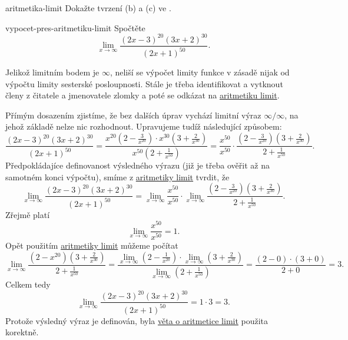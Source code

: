 \begin{exercise}{}{aritmetika-limit}
 Dokažte tvrzení (b) a (c) ve .
\end{exercise}

\begin{problem}{}{vypocet-pres-aritmetiku-limit}
 Spočtěte
 \[
  \lim_{x \to \infty} \frac{(2x - 3)^{20} (3x + 2)^{30}}{(2x + 1)^{50}}.
 \]
\end{problem}
\begin{probsol}
 Jelikož limitním bodem je $\infty$, neliší se výpočet limity funkce v zásadě
 nijak od výpočtu limity sesterské posloupnosti. Stále je třeba identifikovat a
 vytknout  členy z čitatele a jmenovatele zlomky a poté
 se odkázat na \hyperref[thm:aritmetika-limit-funkci]{aritmetiku limit}.

 Přímým dosazením zjistíme, že bez dalších úprav vychází limitní výraz $\infty /
 \infty$, na jehož základě nelze nic rozhodnout. Upravujeme tudíž následující
 způsobem:
 \[
  \frac{(2x-3)^{20}(3x+2)^{30}}{(2x+1)^{50}} = \frac{x^{20}(2 -
  \frac{3}{x^{20}}) \cdot x^{30}(3 + \frac{2}{x^{30}})}{x^{50}(2 +
 	\frac{1}{x^{50}})} = \frac{x^{50}}{x^{50}} \cdot \frac{(2 - \frac{3}{x^{20}})(3
 	+ \frac{2}{x^{30}})}{2 + \frac{1}{x^{50}}}.
 \]
 Předpokládajíce definovanost výsledného výrazu (již je třeba ověřit až na
 samotném konci výpočtu), smíme z
 \hyperref[thm:aritmetika-limit-funkci]{aritmetiky limit} tvrdit, že
 \[
  \lim_{x \to \infty} \frac{(2x-3)^{20}(3x+2)^{30}}{(2x+1)^{50}} = \lim_{x \to
  \infty} \frac{x^{50}}{x^{50}} \cdot \lim_{x \to \infty} \frac{(2 -
  \frac{3}{x^{20}})(3 + \frac{2}{x^{30}})}{2 + \frac{1}{x^{50}}}.
 \]
 Zřejmě platí
 \[
  \lim_{x \to \infty} \frac{x^{50}}{x^{50}} = 1.
 \]
 Opět použitím \hyperref[thm:aritmetika-limit-funkci]{aritmetiky limit} můžeme
 počítat
 \[
  \lim_{x \to \infty} \frac{(2 - x^{20})(3 + \frac{2}{x^{30}})}{2 +
  \frac{1}{x^{50}}} = \frac{\lim_{x \to \infty} (2 - \frac{1}{x^{20}}) \cdot
 	\lim_{x \to \infty} (3 + \frac{2}{x^{30}})}{\lim_{x \to \infty} (2 +
 	\frac{1}{x^{50}})} = \frac{(2 - 0) \cdot (3 + 0)}{2 + 0} = 3.
 \]
 Celkem tedy
 \[
  \lim_{x \to \infty} \frac{(2x-3)^{20}(3x+2)^{30}}{(2x+1)^{50}} = 1 \cdot 3 =
  3.
 \]
 Protože výsledný výraz je definován, byla
 \hyperref[thm:aritmetika-limit-funkci]{věta o aritmetice limit} použita
 korektně.
\end{probsol}

